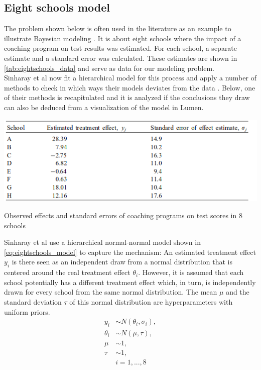 \documentclass{article}
\begin{document}
\subsection{Eight schools model}
\label{subsec:eight_schools}
The problem shown below is often used in the literature as an example to illustrate Bayesian modeling \cite{1439840954}\cite{sinharay2003posterior}\cite{rubin1981estimation}. It is about eight schools where the impact of a coaching program on test results was estimated. For each school, a separate estimate and a standard error was calculated. These estimates are shown in \autoref{tab:eightschools_data} and serve as data for our modeling problem.\\ 
Sinharay et al now fit a hierarchical model for this process and apply a number of methods to check in which ways their models deviates from the data \cite{sinharay2003posterior}. Below, one of their methods is recapitulated and it is analyzed if the conclusions they draw can also be deduced from a visualization of the model in Lumen.
\begin{table}
	\includegraphics[width=\textwidth]{images/eightschools_data.png}
	\caption[Observed effects and standard errors of coaching programs on test scores in 8 schools. Source: \cite{sinharay2003posterior}]{Observed effects and standard errors of coaching programs on test scores in 8 schools}
	\label{tab:eightschools_data}
\end{table}
Sinharay et al use a hierarchical normal-normal model shown in \autoref{eq:eightschools_model} to capture the mechanism: An estimated treatment effect $y_i$ is there seen as an independent draw from a normal distribution that is centered around the real treatment effect $\theta_i$. However, it is assumed that each school potentially has a different treatment effect which, in turn, is independently drawn for every school from the same normal distribution. The mean $\mu$ and the standard deviation $\tau$ of this normal distribution are hyperparameters with uniform priors.
\begin{equation}
\label{eq:eightschools_model}
\begin{split}
y_i &\sim N(\theta_i,\sigma_i),\\
\theta_i &\sim N(\mu,\tau), \\
\mu &\sim 1, \\
\tau &\sim 1, \\
&i=1,...,8
\end{split}
\end{equation}
\end{document}
